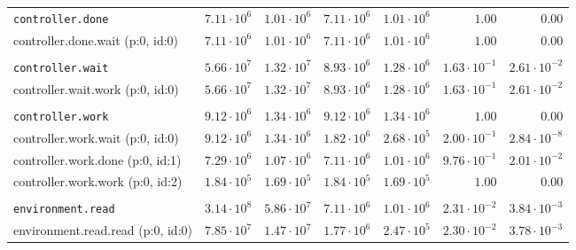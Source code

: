 \begin{table}[htbp]
{\begin{tabular}{lrrrrrr}
\\[-8pt]\texttt{controller.done}              & $7.11 \cdot 10^{6}$ & $1.01 \cdot 10^{6}$ & $7.11 \cdot 10^{6}$ & $1.01 \cdot 10^{6}$ &               $1.00$ &               $0.00$ \\
\hspace{3mm}controller.done.wait (p:0, id:0)  & $7.11 \cdot 10^{6}$ & $1.01 \cdot 10^{6}$ & $7.11 \cdot 10^{6}$ & $1.01 \cdot 10^{6}$ &               $1.00$ &               $0.00$ \\
\\[-8pt]\texttt{controller.wait}              & $5.66 \cdot 10^{7}$ & $1.32 \cdot 10^{7}$ & $8.93 \cdot 10^{6}$ & $1.28 \cdot 10^{6}$ & $1.63 \cdot 10^{-1}$ & $2.61 \cdot 10^{-2}$ \\
\hspace{3mm}controller.wait.work (p:0, id:0)  & $5.66 \cdot 10^{7}$ & $1.32 \cdot 10^{7}$ & $8.93 \cdot 10^{6}$ & $1.28 \cdot 10^{6}$ & $1.63 \cdot 10^{-1}$ & $2.61 \cdot 10^{-2}$ \\
\\[-8pt]\texttt{controller.work}              & $9.12 \cdot 10^{6}$ & $1.34 \cdot 10^{6}$ & $9.12 \cdot 10^{6}$ & $1.34 \cdot 10^{6}$ &               $1.00$ &               $0.00$ \\
\hspace{3mm}controller.work.wait (p:0, id:0)  & $9.12 \cdot 10^{6}$ & $1.34 \cdot 10^{6}$ & $1.82 \cdot 10^{6}$ & $2.68 \cdot 10^{5}$ & $2.00 \cdot 10^{-1}$ & $2.84 \cdot 10^{-8}$ \\
\hspace{3mm}controller.work.done (p:0, id:1)  & $7.29 \cdot 10^{6}$ & $1.07 \cdot 10^{6}$ & $7.11 \cdot 10^{6}$ & $1.01 \cdot 10^{6}$ & $9.76 \cdot 10^{-1}$ & $2.01 \cdot 10^{-2}$ \\
\hspace{3mm}controller.work.work (p:0, id:2)  & $1.84 \cdot 10^{5}$ & $1.69 \cdot 10^{5}$ & $1.84 \cdot 10^{5}$ & $1.69 \cdot 10^{5}$ &               $1.00$ &               $0.00$ \\
\\[-8pt]\texttt{environment.read}             & $3.14 \cdot 10^{8}$ & $5.86 \cdot 10^{7}$ & $7.11 \cdot 10^{6}$ & $1.01 \cdot 10^{6}$ & $2.31 \cdot 10^{-2}$ & $3.84 \cdot 10^{-3}$ \\
\hspace{3mm}environment.read.read (p:0, id:0) & $7.85 \cdot 10^{7}$ & $1.47 \cdot 10^{7}$ & $1.77 \cdot 10^{6}$ & $2.47 \cdot 10^{5}$ & $2.30 \cdot 10^{-2}$ & $3.78 \cdot 10^{-3}$ \\

\end{tabular}}
\end{table}
